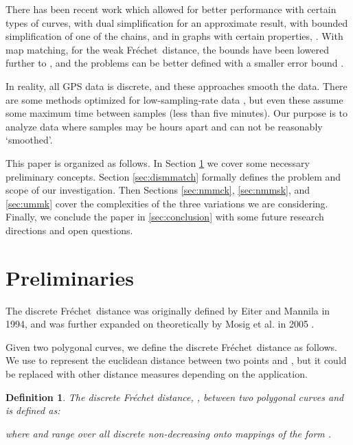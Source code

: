 \documentclass{article}[11pt]
\newcommand{\frechet}{Fr\'echet}
\newtheorem{definition}{Definition}
\begin{document}
There has been recent work which allowed for better performance with certain types
of curves, with dual simplification for an approximate result, with bounded simplification
of one of the chains, and in graphs with certain properties, \cite{Brakatsoulas:2005:VLDB,Buchin:2009:SODA,Chen:2011:ALENEX,Driemel:2012:DCG}.
With map matching, for the weak \frechet\ distance, the bounds have been lowered further to
 \cite{Chen:2008:UP}, and the problems can be better defined with a smaller error bound
\cite{Wenk:2006:SSDBM}. 


In reality, all GPS data is discrete, and these approaches smooth the data.  There are some
methods optimized for low-sampling-rate data \cite{Lou:2009:GIS}, but even these assume
some maximum time between samples (less than five minutes).  Our purpose is to analyze 
data where samples may be hours apart and can not be reasonably `smoothed'. 

This paper is organized as follows. In Section \ref{sec:preliminaries} we cover some necessary
preliminary concepts. Section \ref{sec:dismmatch} formally defines the problem and scope of
our investigation. Then Sections \ref{sec:nmmck}, \ref{sec:nmmsk}, and \ref{sec:ummk} cover the
complexities of the three variations we are considering.  
Finally, we conclude the paper in \ref{sec:conclusion} with some future research directions and open questions.




\section{Preliminaries} \label{sec:preliminaries}


The discrete \frechet\ distance was originally defined by Eiter and Mannila \cite{Eiter:1994:TECH} 
in 1994, and was further expanded on theoretically by Mosig et al. in 2005 \cite{Mosig:2005:CGTA}.

Given two polygonal curves, we define the discrete \frechet\ distance as follows.
We use  to represent the
euclidean distance between two points  and , but it could be
replaced with other distance measures depending on the application. 

\begin{definition} \label{def:dfdformal}
    The discrete Fr\'echet distance, , between two polygonal curves  and  is defined as:
    
    where  and  range over all discrete non-decreasing onto mappings of the form .
\end{definition}
\end{document}
